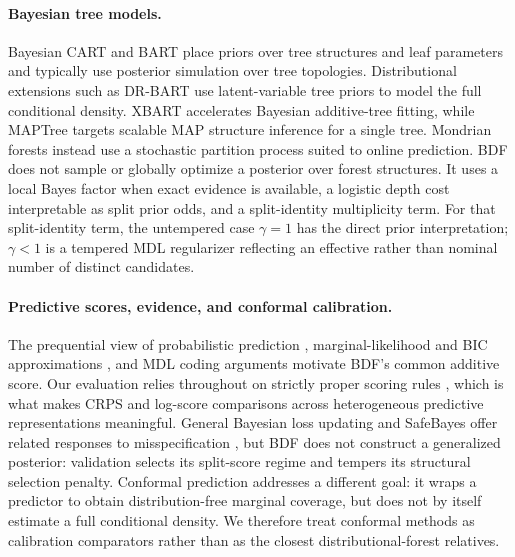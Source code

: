 \documentclass[10pt]{article} %
\begin{document}
\paragraph{Bayesian tree models.}
Bayesian CART and BART \citep{denison1998bayesian,chipman2010bart} place priors over tree structures and leaf parameters and typically use posterior simulation over tree topologies. Distributional extensions such as DR-BART \citep{orlandi2021drbart} use latent-variable tree priors to model the full conditional density. XBART \citep{he2019xbart} accelerates Bayesian additive-tree fitting, while MAPTree \citep{sullivan2024maptree} targets scalable MAP structure inference for a single tree. Mondrian forests \citep{lakshminarayanan2014mondrian} instead use a stochastic partition process suited to online prediction. BDF does not sample or globally optimize a posterior over forest structures. It uses a local Bayes factor when exact evidence is available, a logistic depth cost interpretable as split prior odds, and a split-identity multiplicity term. For that split-identity term, the untempered case $\gamma=1$ has the direct prior interpretation; $\gamma<1$ is a tempered MDL regularizer reflecting an effective rather than nominal number of distinct candidates.

\paragraph{Predictive scores, evidence, and conformal calibration.}
The prequential view of probabilistic prediction \citep{dawid1984present}, marginal-likelihood and BIC approximations \citep{schwarz1978estimating,kass1995bayes}, and MDL coding arguments \citep{vitanyi2000minimum} motivate BDF's common additive score. Our evaluation relies throughout on strictly proper scoring rules \citep{gneiting2007strictly}, which is what makes CRPS and log-score comparisons across heterogeneous predictive representations meaningful. General Bayesian loss updating and SafeBayes offer related responses to misspecification \citep{bissiri2016general,grunwald2017inconsistency}, but BDF does not construct a generalized posterior: validation selects its split-score regime and tempers its structural selection penalty. Conformal prediction \citep{vovk2005algorithmic,lei2018distribution,romano2019conformalized} addresses a different goal: it wraps a predictor to obtain distribution-free marginal coverage, but does not by itself estimate a full conditional density. We therefore treat conformal methods as calibration comparators rather than as the closest distributional-forest relatives.
\end{document}
